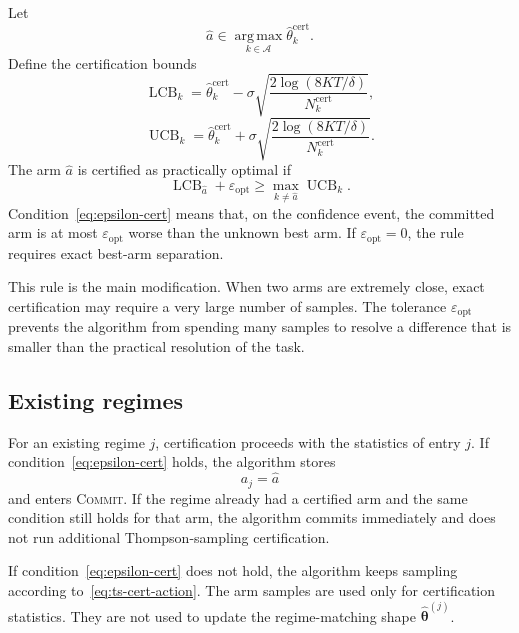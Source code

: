 \documentclass[11pt]{article}
\newcommand{\A}{\mathcal A}
\newcommand{\argmax}{\operatorname*{arg\,max}}
\newcommand{\LCB}{\operatorname{LCB}}
\newcommand{\UCB}{\operatorname{UCB}}
\newcommand{\COMMIT}{\textsc{Commit}\xspace}
\begin{document}
Let
\begin{equation}
    \widehat a
    \in
    \argmax_{k\in\A}\widehat\theta_k^{\mathrm{cert}}.
\end{equation}
Define the certification bounds
\begin{equation}
    \LCB_k
    =
    \widehat\theta_k^{\mathrm{cert}}
    -
    \sigma\sqrt{\frac{2\log(8KT/\delta)}{N_k^{\mathrm{cert}}}},
\end{equation}
\begin{equation}
    \UCB_k
    =
    \widehat\theta_k^{\mathrm{cert}}
    +
    \sigma\sqrt{\frac{2\log(8KT/\delta)}{N_k^{\mathrm{cert}}}}.
\end{equation}
The arm $\widehat a$ is certified as practically optimal if
\begin{equation}
    \LCB_{\widehat a}
    +
    \varepsilon_{\mathrm{opt}}
    \geq
    \max_{k\neq \widehat a}\UCB_k.
    \label{eq:epsilon-cert}
\end{equation}
Condition~\eqref{eq:epsilon-cert} means that, on the confidence event, the committed arm is at most $\varepsilon_{\mathrm{opt}}$ worse than the unknown best arm. If $\varepsilon_{\mathrm{opt}}=0$, the rule requires exact best-arm separation.

This rule is the main modification. When two arms are extremely close, exact certification may require a very large number of samples. The tolerance $\varepsilon_{\mathrm{opt}}$ prevents the algorithm from spending many samples to resolve a difference that is smaller than the practical resolution of the task.

\subsection{Existing regimes}

For an existing regime $j$, certification proceeds with the statistics of entry $j$. If condition~\eqref{eq:epsilon-cert} holds, the algorithm stores
\begin{equation}
    a_j=\widehat a
\end{equation}
and enters \COMMIT. If the regime already had a certified arm and the same condition still holds for that arm, the algorithm commits immediately and does not run additional Thompson-sampling certification.

If condition~\eqref{eq:epsilon-cert} does not hold, the algorithm keeps sampling according to~\eqref{eq:ts-cert-action}. The arm samples are used only for certification statistics. They are not used to update the regime-matching shape $\widehat{\bm\theta}^{(j)}$.
\end{document}
